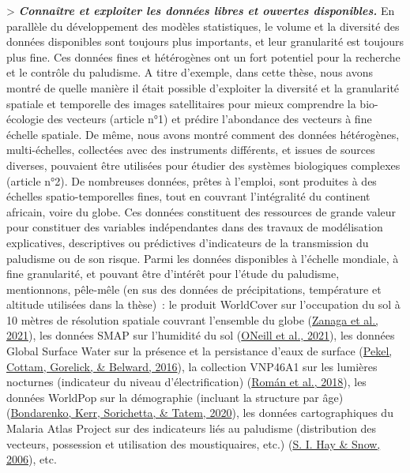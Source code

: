 \documentclass[12pt,twoside]{reedthesis}
\begin{document}
\textgreater{} \textbf{\emph{Connaître et exploiter les données libres et ouvertes disponibles.}} En parallèle du développement des modèles statistiques, le volume et la diversité des données disponibles sont toujours plus importants, et leur granularité est toujours plus fine. Ces données fines et hétérogènes ont un fort potentiel pour la recherche et le contrôle du paludisme. A titre d'exemple, dans cette thèse, nous avons montré de quelle manière il était possible d'exploiter la diversité et la granularité spatiale et temporelle des images satellitaires pour mieux comprendre la bio-écologie des vecteurs (article n°1) et prédire l'abondance des vecteurs à fine échelle spatiale. De même, nous avons montré comment des données hétérogènes, multi-échelles, collectées avec des instruments différents, et issues de sources diverses, pouvaient être utilisées pour étudier des systèmes biologiques complexes (article n°2). De nombreuses données, prêtes à l'emploi, sont produites à des échelles spatio-temporelles fines, tout en couvrant l'intégralité du continent africain, voire du globe. Ces données constituent des ressources de grande valeur pour constituer des variables indépendantes dans des travaux de modélisation explicatives, descriptives ou prédictives d'indicateurs de la transmission du paludisme ou de son risque. Parmi les données disponibles à l'échelle mondiale, à fine granularité, et pouvant être d'intérêt pour l'étude du paludisme, mentionnons, pêle-mêle (en sus des données de précipitations, température et altitude utilisées dans la thèse)~: le produit WorldCover sur l'occupation du sol à 10 mètres de résolution spatiale couvrant l'ensemble du globe (\protect\hyperlink{ref-zanaga_daniele_esa_2021}{Zanaga et al., 2021}), les données SMAP sur l'humidité du sol (\protect\hyperlink{ref-oneill_peggy_e_smap_2021}{ONeill et al., 2021}), les données Global Surface Water sur la présence et la persistance d'eaux de surface (\protect\hyperlink{ref-pekel_high-resolution_2016}{Pekel, Cottam, Gorelick, \& Belward, 2016}), la collection VNP46A1 sur les lumières nocturnes (indicateur du niveau d'électrification) (\protect\hyperlink{ref-roman_nasas_2018}{Román et al., 2018}), les données WorldPop sur la démographie (incluant la structure par âge) (\protect\hyperlink{ref-bondarenko_censusprojection_2020}{Bondarenko, Kerr, Sorichetta, \& Tatem, 2020}), les données cartographiques du Malaria Atlas Project sur des indicateurs liés au paludisme (distribution des vecteurs, possession et utilisation des moustiquaires, etc.) (\protect\hyperlink{ref-hay_malaria_2006}{S. I. Hay \& Snow, 2006}), etc.\\
\end{document}
